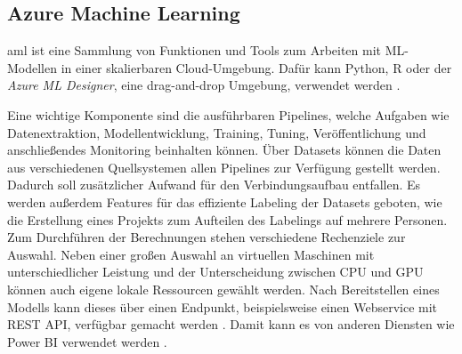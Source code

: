 




\subsection{Azure Machine Learning} \label{sec:grundlagen:azure_dienste:machineLearning}
\ac{aml} ist eine Sammlung von Funktionen und Tools zum Arbeiten mit ML-Modellen in einer skalierbaren Cloud-Umgebung. Dafür kann Python, R oder der \textit{Azure ML Designer}, eine drag-and-drop Umgebung, verwendet werden \cite{soh_data_2020}.

Eine wichtige Komponente sind die ausführbaren Pipelines, welche Aufgaben wie Datenextraktion, Modellentwicklung, Training, Tuning, Veröffentlichung und anschließendes Monitoring beinhalten können. Über Datasets können die Daten aus verschiedenen Quellsystemen allen Pipelines zur Verfügung gestellt werden. Dadurch soll zusätzlicher Aufwand für den Verbindungsaufbau entfallen. Es werden außerdem Features für das effiziente Labeling der Datasets geboten, wie die Erstellung eines Projekts zum Aufteilen des Labelings auf mehrere Personen. Zum Durchführen der Berechnungen stehen verschiedene Rechenziele zur Auswahl. Neben einer großen Auswahl an virtuellen Maschinen mit unterschiedlicher Leistung und der Unterscheidung zwischen CPU und GPU können auch eigene lokale Ressourcen gewählt werden. Nach Bereitstellen eines Modells kann dieses über einen Endpunkt, beispielsweise einen Webservice mit REST API, verfügbar gemacht werden \cite{price_azure_2021}. Damit kann es von anderen Diensten wie Power BI verwendet werden \cite{kemp_tutorial_2021}.

